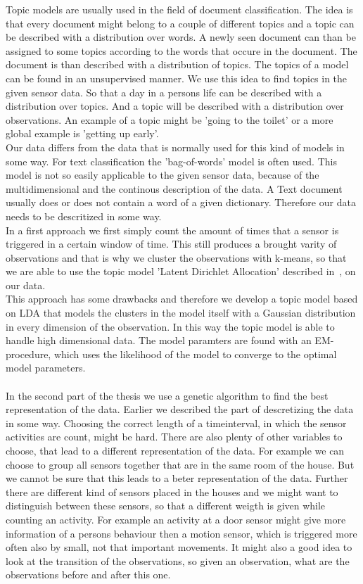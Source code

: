 \documentclass[11pt,a4paper]{article}
\begin{document}
Topic models are usually used in the field of document classification. The idea is that every document might belong to a couple of different topics and a topic can be described with a distribution over words. A newly seen document can than be assigned to some topics according to the words that occure in the document. The document is than described with a distribution of topics. The topics of a model can be found in an unsupervised manner.
We use this idea to find topics in the given sensor data. So that a day in a persons life can be described with a distribution over topics. And a topic will be described with a distribution over observations. An example of a topic might be 'going to the toilet' or a more global example is 'getting up early'.\\
Our data differs from the data that is normally used for this kind of models in some way. For text classification the 'bag-of-words' model is often used. This model is not so easily applicable to the given sensor data, because of the multidimensional and the continous description of the data. A Text document usually does or does not contain a word of a given dictionary. Therefore our data needs to be descritized in some way.\\
In a first approach we first simply count the amount of times that a sensor is triggered in a certain window of time. This still produces a brought varity of observations and that is why we cluster the observations with k-means, so that we are able to use the topic model 'Latent Dirichlet Allocation' described in~\cite{blei2003latent}, on our data.\\
This approach has some drawbacks and therefore we develop a topic model based on LDA that models the clusters in the model itself with a Gaussian distribution in every dimension of the observation. In this way the topic model is able to handle high dimensional data. The model paramters are found with an EM-procedure, which uses the likelihood of the model to converge to the optimal model parameters.\\
\\
In the second part of the thesis we use a genetic algorithm to find the best representation of the data.
Earlier we described the part of descretizing the data in some way. Choosing the correct length of a timeinterval, in which the sensor activities are count, might be hard. There are also plenty of other variables to choose, that lead to a different representation of the data. For example we can choose to group all sensors together that are in the same room of the house. But we cannot be sure that this leads to a beter representation of the data. Further there are different kind of sensors placed in the houses and we might want to distinguish between these sensors, so that a different weigth is given while counting an activity. For example an activity at a door sensor might give more information of a persons behaviour then a motion sensor, which is triggered more often also by small, not that important movements. It might also a good idea to look at the transition of the observations, so given an observation, what are the observations before and after this one.\\
\end{document}
